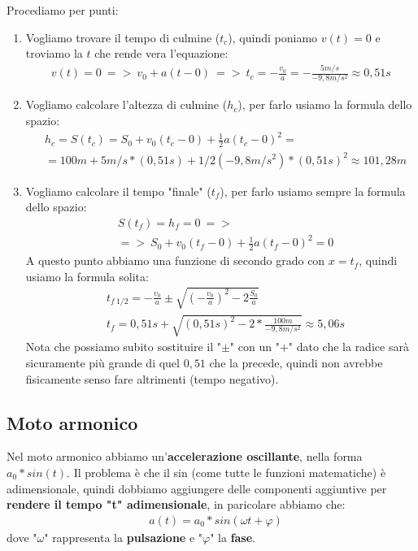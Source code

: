 				Procediamo per punti:
				\begin{enumerate}
					\item Vogliamo trovare il tempo di culmine ($t_c$), quindi poniamo $v(t)=0$ e troviamo la $t$ che rende vera l'equazione:
					\begin{align*}
						v(t)=0\ =>\ v_0+a(t-0)\ =>\ t_c=-\frac{v_0}{a} = -\frac{5m/s}{-9,8m/s^2}\approx0,51s
					\end{align*}
					\item Vogliamo calcolare l'altezza di culmine ($h_c$), per farlo usiamo la formula dello spazio:
					\begin{align*}
						&h_c = S(t_c)=S_0+v_0(t_c-0)+\frac{1}{2}a(t_c-0)^2=\\
						&=100m + 5m/s * (0,51s)+1/2(-9,8m/s^2)*(0,51s)^2\approx 101,28m
					\end{align*}
					\item Vogliamo calcolare il tempo "finale" ($t_f$), per farlo usiamo sempre la formula dello spazio:
					\begin{align*}
						&S(t_f)= h_f = 0\ =>\ \\
						&=>\ S_0+v_0(t_f-0)+\frac{1}{2}a(t_f-0)^2=0
					\end{align*}
					A questo punto abbiamo una funzione di secondo grado con $x = t_f$, quindi usiamo la formula solita:
					\begin{align*}
						&t_{f\ 1/2}=-\frac{v_0}{a}\pm\sqrt{(-\frac{v_0}{a})^2-2\frac{S_0}{a}}\\
						&t_f = 0,51s + \sqrt{(0,51 s)^2-2*\frac{100m}{-9,8m/s^2}} \approx 5,06s
					\end{align*}
					Nota che possiamo subito sostituire il "$\pm$" con un "$+$" dato che la radice sarà sicuramente più grande di quel $0,51$ che la precede, quindi non avrebbe fisicamente senso fare altrimenti (tempo negativo).
				\end{enumerate}

		\subsection{Moto armonico}
			Nel moto armonico abbiamo un'\textbf{accelerazione oscillante}, nella forma \underline{$a_0*sin(t)$}. Il problema è che il sin (come tutte le funzioni matematiche) è adimensionale, quindi dobbiamo aggiungere delle componenti aggiuntive per \textbf{rendere il tempo "t" adimensionale}, in paricolare abbiamo che:
			\begin{align*}
				&a(t) = a_0 * sin(\omega t + \varphi)
			\end{align*}
			dove "$\omega$" rappresenta la \textbf{pulsazione} e "$\varphi$" la \textbf{fase}.
